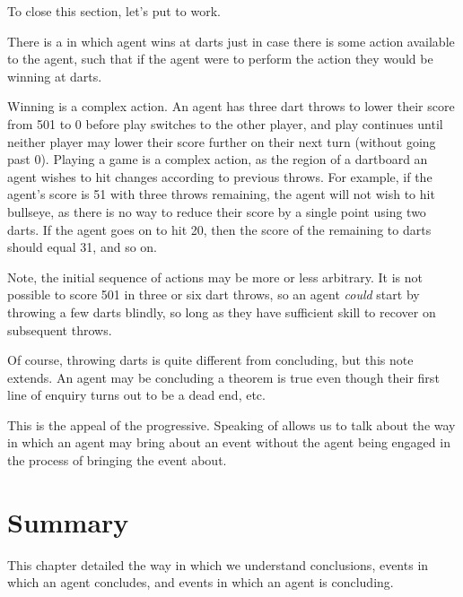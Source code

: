 \begin{note}
  To close this section, let's put  to work.

  \begin{illustration}[Darts]
    There is a \pevent{} in which agent wins at darts just in case there is some action available to the agent, such that if the agent were to perform the action they would be winning at darts.

    Winning is a complex action.
  An agent has three dart throws to lower their score from 501 to 0 before play switches to the other player, and play continues until neither player may lower their score further on their next turn (without going past 0).
  Playing a game is a complex action, as the region of a dartboard an agent wishes to hit changes according to previous throws.
  For example, if the agent's score is 51 with three throws remaining, the agent will not wish to hit bullseye, as there is no way to reduce their score by a single point using two darts.
  If the agent goes on to hit 20, then the score of the remaining to darts should equal 31, and so on.
  \end{illustration}

  Note, the initial sequence of actions may be more or less arbitrary.
  It is not possible to score 501 in three or six dart throws, so an agent \emph{could} start by throwing a few darts blindly, so long as they have sufficient skill to recover on subsequent throws.

  Of course, throwing darts is quite different from concluding, but this note extends.
  An agent may be concluding a theorem is true even though their first line of enquiry turns out to be a dead end, etc.

  This is the appeal of the progressive.
  Speaking of  allows us to talk about the way in which an agent may bring about an event without the agent being engaged in the process of bringing the event about.
\end{note}

\newpage

\section*{Summary}

\begin{note}
  This chapter detailed the way in which we understand conclusions, events in which an agent concludes, and events in which an agent is concluding.
\end{note}

